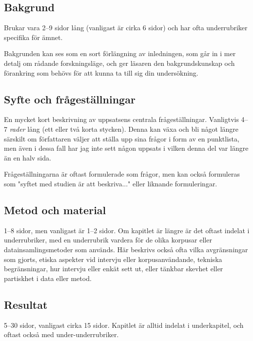 \subsection{Bakgrund}
\label{rubrik.bakgrund}

Brukar vara 2--9 sidor lång (vanligast är cirka 6 sidor) och har ofta
underrubriker specifika för ämnet.

Bakgrunden kan ses som en sort förlängning av inledningen, som går in i mer
detalj om rådande forskningsläge, och ger läsaren den bakgrundskunskap och
förankring som behövs för att kunna ta till sig din undersökning.


\subsection{Syfte och frågeställningar}
\label{rubrik.syfte}

En mycket kort beskrivning av uppsatsens centrala frågeställningar. Vanligtvis
4–7 \emph{rader} lång (ett eller två korta stycken). Denna kan växa och bli
något längre särskilt om författaren väljer att ställa upp sina frågor i form
av en punktlista, men även i dessa fall har jag inte sett någon uppsats i
vilken denna del var längre än en halv sida.

Frågeställningarna är oftast formulerade som frågor, men kan också formuleras
som "syftet med studien är att beskriva..." eller liknande formuleringar.


\subsection{Metod och material}
\label{rubrik.metod}

1--8 sidor, men vanligast är 1--2 sidor. Om kapitlet är längre är det oftast
indelat i underrubriker, med en underrubrik vardera för de olika korpusar eller
datainsamlingsmetoder som används. Här beskrivs också ofta vilka avgränsningar
som gjorts, etiska aspekter vid intervju eller korpusanvändande, tekniska
begränsningar, hur intervju eller enkät sett ut, eller tänkbar skevhet eller
partiskhet i data eller metod.


\subsection{Resultat}
\label{rubrik.resultat}

5--30 sidor, vanligast cirka 15 sidor. Kapitlet är alltid indelat i
underkapitel, och oftast också med under-underrubriker.


